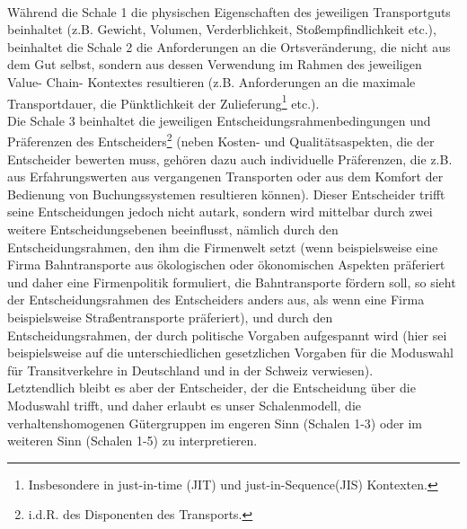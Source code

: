 \begin{figure}[htbp]
  \centering
  \caption{}
  \label{}
\end{figure}
~\\
Während die Schale 1 die physischen Eigenschaften des jeweiligen Transportguts beinhaltet (z.B. Gewicht, Volumen, Verderblichkeit, Stoßempfindlichkeit etc.), beinhaltet die Schale 2 die Anforderungen an die Ortsveränderung, die nicht aus dem Gut selbst, sondern aus dessen Verwendung im Rahmen des jeweiligen Value- Chain- Kontextes resultieren (z.B. Anforderungen an die maximale Transportdauer, die Pünktlichkeit der Zulieferung\footnote{%
 Insbesondere in just-in-time (JIT) und \glqq just-in-Sequence\grqq  (JIS) Kontexten.
}%
 etc.).~\\
Die Schale 3 beinhaltet die jeweiligen Entscheidungsrahmenbedingungen und Präferenzen des Entscheiders\footnote{%
 i.d.R. des Disponenten des Transports.
}%
 (neben Kosten- und Qualitätsaspekten, die der Entscheider bewerten muss, gehören dazu auch individuelle Präferenzen, die z.B. aus Erfahrungswerten aus vergangenen Transporten oder aus dem Komfort der Bedienung von Buchungssystemen resultieren können). Dieser Entscheider trifft seine Entscheidungen jedoch nicht autark, sondern wird mittelbar durch zwei weitere Entscheidungsebenen beeinflusst, nämlich durch den Entscheidungsrahmen, den ihm die Firmenwelt setzt (wenn beispielsweise eine Firma Bahntransporte aus ökologischen oder ökonomischen Aspekten präferiert und daher eine Firmenpolitik formuliert, die Bahntransporte fördern soll, so sieht der Entscheidungsrahmen des Entscheiders anders aus, als wenn eine Firma beispielsweise Straßentransporte präferiert), und durch den Entscheidungsrahmen, der durch politische Vorgaben aufgespannt wird (hier sei beispielsweise auf die unterschiedlichen gesetzlichen Vorgaben für die Moduswahl für Transitverkehre in Deutschland und in der Schweiz verwiesen).~\\
Letztendlich bleibt es aber der Entscheider, der die Entscheidung über die Moduswahl trifft, und daher erlaubt es unser Schalenmodell, die verhaltenshomogenen Gütergruppen im engeren Sinn (Schalen 1-3) oder im weiteren Sinn (Schalen 1-5) zu interpretieren.~\\
